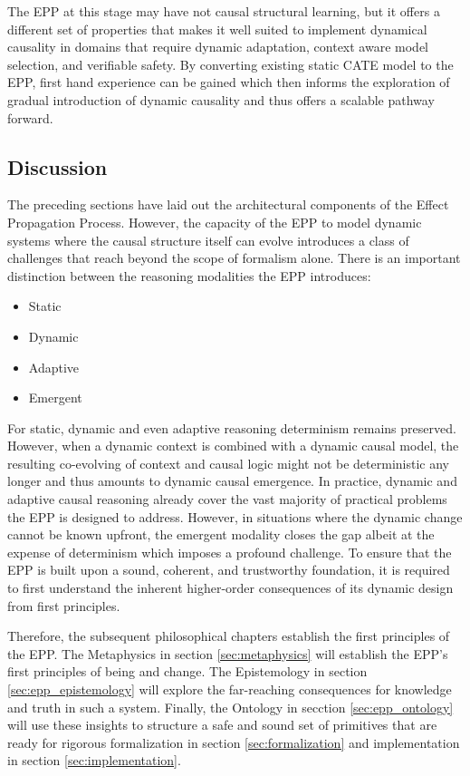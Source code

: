 The EPP at this stage may have not causal structural learning, but it offers a different set of properties that makes it well suited to implement dynamical causality in domains that require dynamic adaptation, context aware model selection, and verifiable safety. By converting existing static CATE model to the EPP, first hand experience can be gained which then informs the exploration of gradual introduction of dynamic causality and thus offers a scalable pathway forward.  


\subsection{Discussion}
\label{sec:epp_discussion}

The preceding sections have laid out the architectural components of the Effect Propagation Process. However, the capacity of the EPP to model dynamic systems where the causal structure itself can evolve introduces a class of challenges that reach beyond the scope of formalism alone. There is an important distinction between the reasoning modalities the EPP introduces:

\begin{itemize}
	\item Static
	\item Dynamic
	\item Adaptive 
	\item Emergent 
\end{itemize}

For static, dynamic and even adaptive reasoning determinism remains preserved. However, when a dynamic context is combined with a dynamic causal model, the resulting co-evolving of context and causal logic might not be deterministic any longer and thus amounts to dynamic causal emergence. In practice, dynamic and adaptive causal reasoning already cover the vast majority of practical problems the EPP is designed to address. However, in situations where the dynamic change cannot be known upfront, the emergent modality closes the gap albeit at the expense of determinism which imposes a profound challenge. To ensure that the EPP is built upon a sound, coherent, and trustworthy foundation, it is required to first understand the inherent higher-order consequences of its dynamic design from first principles.

Therefore, the subsequent philosophical chapters establish the first principles of the EPP. The Metaphysics in section \ref{sec:metaphysics} will establish the EPP's first principles of being and change. The Epistemology in section \ref{sec:epp_epistemology} will explore the far-reaching consequences for knowledge and truth in such a system. Finally, the Ontology in secction \ref{sec:epp_ontology} will use these insights to structure a safe and sound set of primitives that are ready for rigorous formalization in section \ref{sec:formalization} and implementation in section \ref{sec:implementation}. 

\newpage
